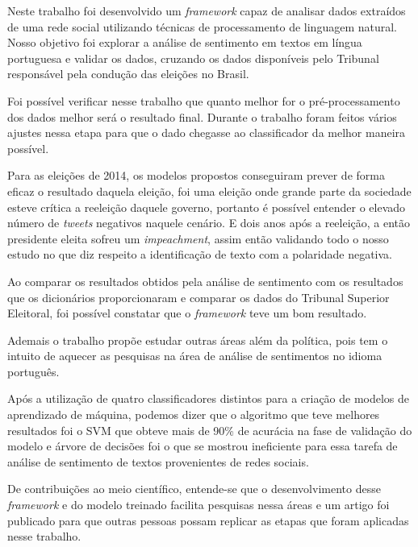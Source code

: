 Neste trabalho foi desenvolvido um \textit{framework} capaz de
analisar dados extraídos de uma rede social utilizando técnicas
de processamento de linguagem natural. Nosso objetivo foi
explorar a análise de sentimento em textos em língua portuguesa e
validar os dados, cruzando os dados disponíveis pelo Tribunal
responsável pela condução das eleições no Brasil.


Foi possível verificar nesse trabalho que quanto melhor for o pré-processamento dos 
dados melhor será o resultado final. Durante o trabalho foram feitos vários ajustes nessa
etapa para que o dado chegasse ao classificador da melhor maneira possível.

Para as eleições de 2014, os modelos propostos conseguiram prever de forma eficaz o resultado 
daquela eleição, foi uma eleição onde grande parte da sociedade esteve crítica a reeleição daquele governo,
portanto é possível entender o elevado número de \textit{tweets} negativos naquele cenário. E dois anos após a 
reeleição, a então presidente eleita sofreu um \textit{impeachment}, assim então validando todo o nosso estudo 
no que diz respeito a identificação de texto com a polaridade negativa.

Ao comparar os resultados obtidos pela análise de sentimento
com os resultados que os dicionários proporcionaram e comparar os dados do Tribunal
Superior Eleitoral, foi possível constatar que o \textit{framework} teve
um bom resultado.

Ademais o trabalho propõe estudar outras áreas além da política, pois tem o intuito de aquecer 
as pesquisas na área de análise de sentimentos no idioma português. 

Após a utilização de quatro classificadores distintos para a criação de modelos de aprendizado de máquina,
podemos dizer que o algoritmo que teve melhores resultados foi o \acrshort{SVM} que obteve mais de 90\% de acurácia
na fase de validação do modelo e árvore de decisões foi o que se mostrou ineficiente para essa tarefa de 
análise de sentimento de textos provenientes de redes sociais.


De contribuições ao meio científico, entende-se que o desenvolvimento desse \textit{framework} e do modelo treinado facilita
pesquisas nessa áreas e um artigo foi publicado para que outras pessoas possam replicar as etapas que foram aplicadas nesse trabalho.

